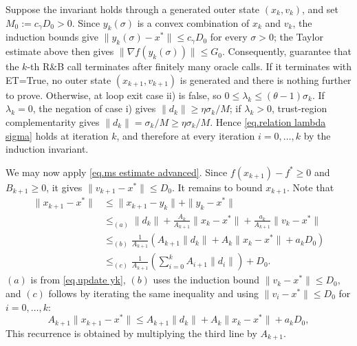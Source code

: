 \documentclass[moor,sglanonrev]{informs4}
\begin{document}
\begin{APPENDICES}
    Suppose the invariant holds through a generated outer state $(x_k,v_k)$, and set $M_0:=c_\gamma D_0>0$. Since $y_k(\sigma)$ is a convex combination of $x_k$ and $v_k$, the induction bounds give
    \(
        \|y_k(\sigma)-x^*\|\leq c_\gamma D_0
    \)
    for every $\sigma>0$; the Taylor estimate above then gives $\|\nabla f(y_k(\sigma))\|\leq G_0$. Consequently,  guarantee that the $k$-th R\&B call terminates after finitely many oracle calls. If it terminates with ET=True, no outer state $(x_{k+1},v_{k+1})$ is generated and there is nothing further to prove. Otherwise, at loop exit case ii) is false, so $0\leq\lambda_k\leq(\theta-1)\sigma_k$. If $\lambda_k=0$, the negation of case i) gives $\|d_k\|\geq\eta\sigma_k/M$; if $\lambda_k>0$, trust-region complementarity gives $\|d_k\|=\sigma_k/M\geq\eta\sigma_k/M$. Hence \eqref{eq.relation lambda sigma} holds at iteration $k$, and therefore at every iteration $i=0,\ldots,k$ by the induction invariant.

    We may now apply \eqref{eq.ms estimate advanced}. Since $f(x_{k+1})-f^*\geq0$ and $B_{k+1}\geq0$, it gives
    \(
        \|v_{k+1}-x^*\|\leq D_0.
    \)
    It remains to bound $x_{k+1}$. Note that
    \begin{equation*}
        \begin{aligned}
            \|x_{k+1}-x^*\| & \leq \|x_{k+1}-y_k\| + \|y_k-x^*\|                                            \\
                            & \leq_{(a)} \|d_k\|+ \frac{A_k}{A_{k+1}} \|x_k-x^*\| +\frac{a_k}{A_{k+1}}\|v_k-x^*\| \\
                            & \leq_{(b)} \frac{1}{A_{k+1}}\left(A_{k+1}\|d_k\| +A_k\|x_k-x^*\| +  a_k D_0\right)  \\
                            & \leq_{(c)} \frac{1}{A_{k+1}}\left (\sum_{i=0}^k A_{i+1}\|d_i\|\right)+D_0.
        \end{aligned}
    \end{equation*}
    $(a)$ is from \eqref{eq.update yk}, $(b)$ uses the induction bound $\|v_k-x^*\|\leq D_0$, and $(c)$ follows by iterating the same inequality and using $\|v_i-x^*\|\leq D_0$ for $i=0,\ldots,k$:
    \begin{equation*}
        A_{k+1} \|x_{k+1}-x^*\|\leq A_{k+1}\|d_k\|+A_k\|x_k-x^*\|+a_k D_0,
    \end{equation*}
    This recurrence is obtained by multiplying the third line by $A_{k+1}$.


\end{APPENDICES}
\end{document}
